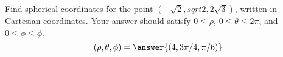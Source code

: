 \begin{problem}
Find spherical coordinates for the point $\left(-\sqrt{2}, sqrt{2}, 2\sqrt{3}\right)$, written in Cartesian coordinates. Your answer should satisfy $0\leq \rho$, $0\leq \theta \leq 2\pi$, and $0\leq \phi \leq \phi$.
\[
(\rho, \theta, \phi) = \answer{(4, 3\pi/4, \pi/6)}
\]
\end{problem}